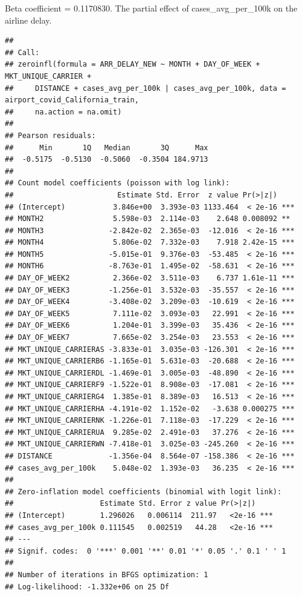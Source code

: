 \documentclass[
]{article}
\begin{document}
Beta coefficient = 0.1170830. The partial effect of
cases\_avg\_per\_100k on the airline delay.

\begin{verbatim}
## 
## Call:
## zeroinfl(formula = ARR_DELAY_NEW ~ MONTH + DAY_OF_WEEK + MKT_UNIQUE_CARRIER + 
##     DISTANCE + cases_avg_per_100k | cases_avg_per_100k, data = airport_covid_California_train, 
##     na.action = na.omit)
## 
## Pearson residuals:
##      Min       1Q   Median       3Q      Max 
##  -0.5175  -0.5130  -0.5060  -0.3504 184.9713 
## 
## Count model coefficients (poisson with log link):
##                        Estimate Std. Error  z value Pr(>|z|)    
## (Intercept)           3.846e+00  3.393e-03 1133.464  < 2e-16 ***
## MONTH2                5.598e-03  2.114e-03    2.648 0.008092 ** 
## MONTH3               -2.842e-02  2.365e-03  -12.016  < 2e-16 ***
## MONTH4                5.806e-02  7.332e-03    7.918 2.42e-15 ***
## MONTH5               -5.015e-01  9.376e-03  -53.485  < 2e-16 ***
## MONTH6               -8.763e-01  1.495e-02  -58.631  < 2e-16 ***
## DAY_OF_WEEK2          2.366e-02  3.511e-03    6.737 1.61e-11 ***
## DAY_OF_WEEK3         -1.256e-01  3.532e-03  -35.557  < 2e-16 ***
## DAY_OF_WEEK4         -3.408e-02  3.209e-03  -10.619  < 2e-16 ***
## DAY_OF_WEEK5          7.111e-02  3.093e-03   22.991  < 2e-16 ***
## DAY_OF_WEEK6          1.204e-01  3.399e-03   35.436  < 2e-16 ***
## DAY_OF_WEEK7          7.665e-02  3.254e-03   23.553  < 2e-16 ***
## MKT_UNIQUE_CARRIERAS -3.833e-01  3.035e-03 -126.301  < 2e-16 ***
## MKT_UNIQUE_CARRIERB6 -1.165e-01  5.631e-03  -20.688  < 2e-16 ***
## MKT_UNIQUE_CARRIERDL -1.469e-01  3.005e-03  -48.890  < 2e-16 ***
## MKT_UNIQUE_CARRIERF9 -1.522e-01  8.908e-03  -17.081  < 2e-16 ***
## MKT_UNIQUE_CARRIERG4  1.385e-01  8.389e-03   16.513  < 2e-16 ***
## MKT_UNIQUE_CARRIERHA -4.191e-02  1.152e-02   -3.638 0.000275 ***
## MKT_UNIQUE_CARRIERNK -1.226e-01  7.118e-03  -17.229  < 2e-16 ***
## MKT_UNIQUE_CARRIERUA  9.285e-02  2.491e-03   37.276  < 2e-16 ***
## MKT_UNIQUE_CARRIERWN -7.418e-01  3.025e-03 -245.260  < 2e-16 ***
## DISTANCE             -1.356e-04  8.564e-07 -158.386  < 2e-16 ***
## cases_avg_per_100k    5.048e-02  1.393e-03   36.235  < 2e-16 ***
## 
## Zero-inflation model coefficients (binomial with logit link):
##                    Estimate Std. Error z value Pr(>|z|)    
## (Intercept)        1.296026   0.006114  211.97   <2e-16 ***
## cases_avg_per_100k 0.111545   0.002519   44.28   <2e-16 ***
## ---
## Signif. codes:  0 '***' 0.001 '**' 0.01 '*' 0.05 '.' 0.1 ' ' 1 
## 
## Number of iterations in BFGS optimization: 1 
## Log-likelihood: -1.332e+06 on 25 Df
\end{verbatim}
\end{document}
